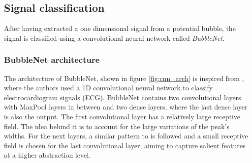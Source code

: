 		
		\subsection{Signal classification}
		After having extracted a one dimensional signal from a potential bubble, the signal is classified using a convolutional neural network called \textit{BubbleNet}. 

		\subsubsection{BubbleNet architecture}		
		The architecture of BubbleNet, shown in figure \ref{fig:cnn_arch} is inspired from \citet{Li2017}, where the authors used a 1D convolutional neural network to classify electrocardiogram signals (ECG). BubbleNet contains two convolutional layers with MaxPool layers in between and two dense layers, where the last dense layer is also the output. The first convolutional layer has a relatively large receptive field. The idea behind it is to account for the large variations of the peak's widths. For the next layers, a similar pattern to \citet{Li2017} is followed and a small receptive field is chosen for the last convolutional layer, aiming to capture salient features at a higher abstraction level. 
		
